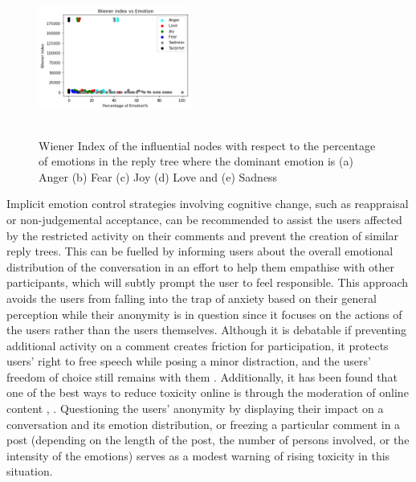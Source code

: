 \documentclass[acmtog]{acmart}
\begin{document}
\begin{figure}[h]
\begin{minipage}{.33\textwidth}
  \end{minipage}%
  \begin{minipage}{.33\textwidth}
    \centering
    \includegraphics[width=5cm,height=5cm,keepaspectratio]{sad_wie_peter1.png}
  \end{minipage}
  
  \caption{Wiener Index of the influential nodes with respect to the percentage of emotions in the reply tree where the dominant emotion is (a) Anger (b) Fear (c) Joy (d) Love and (e) Sadness}
  \label{SampleConvw}
  \end{figure}
Implicit emotion control strategies involving cognitive change, such as reappraisal or non-judgemental acceptance, can be recommended to assist the users affected by the restricted activity on their comments and prevent the creation of similar reply trees. This can be fuelled by informing users about the overall emotional distribution of the conversation in an effort to help them empathise with other participants, which will subtly prompt the user to feel responsible. This approach avoids the users from  falling into the trap of anxiety based on their general perception while their anonymity is in question since it focuses on the actions of the users rather than the users themselves. Although it is debatable if preventing additional activity on a comment creates friction for participation, it protects users' right to free speech while posing a minor distraction, and the users' freedom of choice still remains with them \cite{kiskola2021applying}. Additionally, it has been found that one of the best ways to reduce toxicity online is through the moderation of online content \cite{thomas2022s}, \cite{jhaver2021evaluating}. Questioning the users' anonymity by displaying their impact on a conversation and its emotion distribution, or freezing a particular comment in a post (depending on the length of the post, the number of persons involved, or the intensity of the emotions) serves as a modest warning of rising toxicity in this situation.
\end{document}
